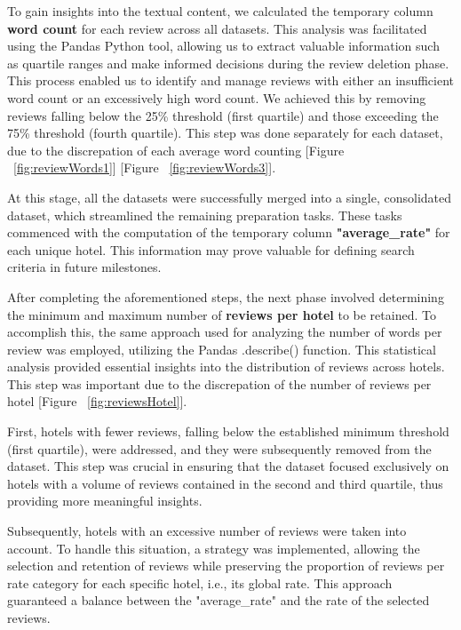 \documentclass[sigconf]{acmart}
\begin{document}
To gain insights into the textual content, we calculated the temporary column \textbf{word count} for each review across all datasets. This analysis was facilitated using the Pandas \cite{Pandas} Python tool, allowing us to extract valuable information such as quartile ranges and make informed decisions during the review deletion phase. This process enabled us to identify and manage reviews with either an insufficient word count or an excessively high word count. We achieved this by removing reviews falling below the 25\% threshold (first quartile) and those exceeding the 75\% threshold (fourth quartile). This step was done separately for each dataset, due to the discrepation of each average word counting [Figure ~\ref{fig:reviewWords1}] [Figure ~\ref{fig:reviewWords3}].

At this stage, all the datasets were successfully merged into a single, consolidated dataset, which streamlined the remaining preparation tasks. These tasks commenced with the computation of the temporary column \textbf{"average\_rate"} for each unique hotel. This information may prove valuable for defining search criteria in future milestones.

After completing the aforementioned steps, the next phase involved determining the minimum and maximum number of \textbf{reviews per hotel} to be retained. To accomplish this, the same approach used for analyzing the number of words per review was employed, utilizing the Pandas \cite{Pandas} .describe() function. This statistical analysis provided essential insights into the distribution of reviews across hotels. This step was important due to the discrepation of the number of reviews per hotel [Figure ~\ref{fig:reviewsHotel}].

First, hotels with fewer reviews, falling below the established minimum threshold (first quartile), were addressed, and they were subsequently removed from the dataset. This step was crucial in ensuring that the dataset focused exclusively on hotels with a volume of reviews contained in the second and third quartile, thus providing more meaningful insights.

Subsequently, hotels with an excessive number of reviews were taken into account. To handle this situation, a strategy was implemented, allowing the selection and retention of reviews while preserving the proportion of reviews per rate category for each specific hotel, i.e., its global rate. This approach guaranteed a balance between the "average\_rate" and the rate of the selected reviews.
\end{document}
